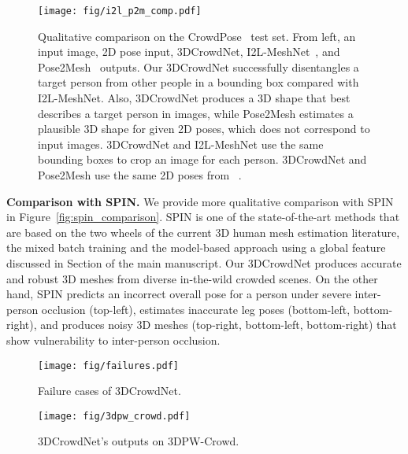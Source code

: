 \documentclass[10pt,twocolumn,letterpaper]{article}
\begin{document}
\begin{figure*}
\vspace*{2mm}
\begin{center}
\texttt{[image: fig/i2l\_p2m\_comp.pdf]}
\end{center}
\vspace*{-3mm}
  \caption{
  Qualitative comparison on the CrowdPose~\cite{li2019crowdpose} test set. From left, an input image, 2D pose input, 3DCrowdNet, I2L-MeshNet~\cite{moon2020i2l}, and Pose2Mesh~\cite{choi2020p2m} outputs. Our 3DCrowdNet successfully disentangles a target person from other people in a bounding box compared with I2L-MeshNet. Also, 3DCrowdNet produces a 3D shape that best describes a target person in images, while Pose2Mesh estimates a plausible 3D shape for given 2D poses, which does not correspond to input images. 3DCrowdNet and I2L-MeshNet use the same bounding boxes to crop an image for each person. 3DCrowdNet and Pose2Mesh use the same 2D poses from ~\cite{cheng2020higherhrnet}.
  }
\vspace*{-3mm}
\label{fig:i2l_p2m_quality_comparison}
\end{figure*}


\noindent\textbf{Comparison with SPIN.}
We provide more qualitative comparison with SPIN~\cite{kolotouros2019learning} in Figure~\ref{fig:spin_comparison}.
SPIN is one of the state-of-the-art methods that are based on the two wheels of the current 3D human mesh estimation literature, the mixed batch training and the model-based approach using a global feature discussed in Section  of the main manuscript.
Our 3DCrowdNet produces accurate and robust 3D meshes from diverse in-the-wild crowded scenes.
On the other hand, SPIN predicts an incorrect overall pose for a person under severe inter-person occlusion (top-left), estimates inaccurate leg poses (bottom-left, bottom-right), and produces noisy 3D meshes (top-right, bottom-left, bottom-right) that show vulnerability to inter-person occlusion. 

\begin{figure*}
\begin{center}
\texttt{[image: fig/failures.pdf]}
\end{center}
\vspace*{-3mm}
  \caption{
  Failure cases of 3DCrowdNet.
  }
\label{fig:failure_quality}
\end{figure*}


\begin{figure}
\begin{center}
\texttt{[image: fig/3dpw\_crowd.pdf]}
\end{center}
  \caption{
 3DCrowdNet's outputs on 3DPW-Crowd.
  }
\label{fig:3dpw_crowd_result}
\end{figure}
\end{document}
